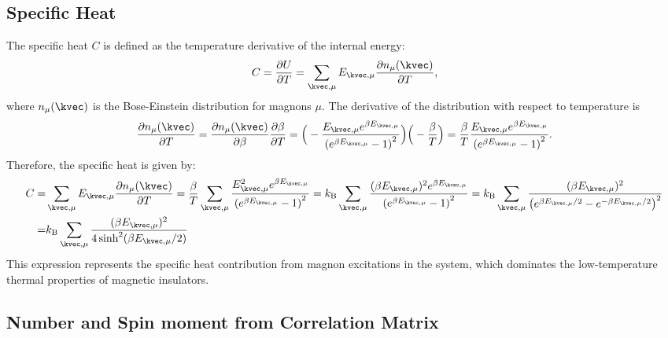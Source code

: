 \subsection{Specific Heat}\label{subsec: Specific Heat}
The specific heat $C$ is defined as the temperature derivative of the internal energy:
\begin{equation}
    C = \frac{\partial U}{\partial T} = \sum_{\kvec, \mu} E_{\kvec, \mu} \frac{\partial n_{\mu}(\kvec)}{\partial T},
\end{equation}
where $n_{\mu}(\kvec)$ is the Bose-Einstein distribution for magnons $\mu$. 
The derivative of the distribution with respect to temperature is 
\begin{equation}
    \frac{\partial n_{\mu}(\kvec)}{\partial T} 
    =  \frac{\partial n_{\mu}(\kvec)}{\partial \beta} \frac{\partial \beta}{\partial T} \\
    =  \Big( - \frac{E_{\kvec, \mu} e^{\beta E_{\kvec, \mu}}}{\left( e^{\beta E_{\kvec, \mu}} - 1 \right)^2} \Big) \Big( - \frac{\beta}{T}\Big) 
    =  \frac{\beta}{T} \frac{E_{\kvec, \mu} e^{\beta E_{\kvec, \mu}}}{\left( e^{\beta E_{\kvec, \mu}} - 1 \right)^2}.
\end{equation}
Therefore, the specific heat is given by:
\begin{equation}
    \begin{split}
        C = & \sum_{\kvec, \mu} E_{\kvec, \mu} \frac{\partial n_{\mu}(\kvec)}{\partial T} 
        = \frac{\beta}{T} \sum_{\kvec, \mu} \frac{E_{\kvec, \mu}^2 e^{\beta E_{\kvec, \mu}}}{\left( e^{\beta E_{\kvec, \mu}} - 1 \right)^2}
        = k_{\rm B} \sum_{\kvec, \mu} \frac{(\beta E_{\kvec, \mu})^2 e^{\beta E_{\kvec, \mu}}}{\left( e^{\beta E_{\kvec, \mu}} - 1 \right)^2}
        =  k_{\rm B} \sum_{\kvec, \mu} \frac{ (\beta E_{\kvec, \mu})^2 }{\left( e^{\beta E_{\kvec, \mu}/2} - e^{-\beta E_{\kvec, \mu}/2} \right)^2} \\
        = &  k_{\rm B} \sum_{\kvec, \mu} \frac{ (\beta E_{\kvec, \mu})^2 }{4 \sinh^{2} (\beta E_{\kvec, \mu}/2 )}
    \end{split}
\end{equation}
This expression represents the specific heat contribution from magnon excitations in the system, which dominates the low-temperature thermal properties of magnetic insulators.



\subsection{Number and Spin moment from Correlation Matrix}\label{subsec: Number expectation value/Spin moment}

